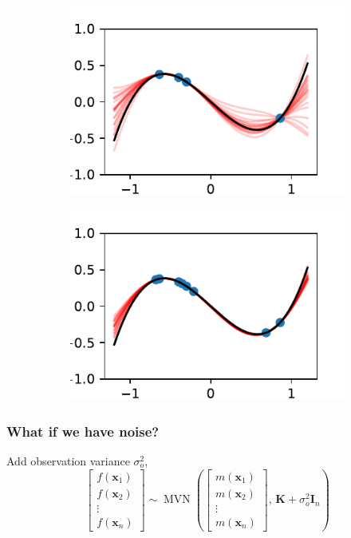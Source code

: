 \documentclass{beamer}
\DeclareMathOperator{\MVN}{MVN}
\begin{document}
\begin{frame}
\begin{figure}
\begin{subfigure}[t]{0.4\textwidth}
            \includegraphics[width=\textwidth]{cub_GP_4_iters.pdf}
        \end{subfigure}%
        \begin{subfigure}[t]{0.4\textwidth}
            \centering
            \includegraphics[width=\textwidth]{cub_GP_8_iters.pdf}
        \end{subfigure}%
    \end{figure}
\end{frame}

\begin{frame}
    \frametitle{What if we have noise?}
    Add observation variance $\sigma^2_o$, $$\begin{bmatrix}
            f(\mathbf{x}_1) \\ f(\mathbf{x}_2)\\ \vdots\\ f(\mathbf{x}_n)
        \end{bmatrix} \sim
        \MVN\left(\begin{bmatrix}
            m(\mathbf{x}_1) \\ m(\mathbf{x}_2)\\ \vdots\\ m(\mathbf{x}_n)
        \end{bmatrix},\, \mathbf{K} + \sigma^2_o\mathbf{I}_n\right)$$
\end{frame}
\end{document}
